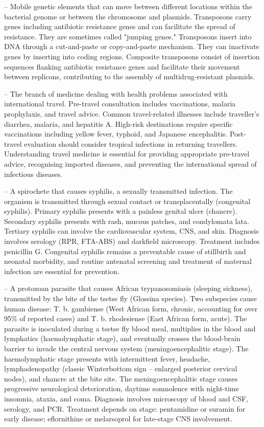 -- Mobile genetic elements that can move between different locations within the bacterial genome or between the chromosome and plasmids. Transposons carry genes including antibiotic resistance genes and can facilitate the spread of resistance. They are sometimes called "jumping genes." Transposons insert into DNA through a cut-and-paste or copy-and-paste mechanism. They can inactivate genes by inserting into coding regions. Composite transposons consist of insertion sequences flanking antibiotic resistance genes and facilitate their movement between replicons, contributing to the assembly of multidrug-resistant plasmids.

-- The branch of medicine dealing with health problems associated with international travel. Pre-travel consultation includes vaccinations, malaria prophylaxis, and travel advice. Common travel-related illnesses include traveller's diarrhea, malaria, and hepatitis A. High-risk destinations require specific vaccinations including yellow fever, typhoid, and Japanese encephalitis. Post-travel evaluation should consider tropical infections in returning travellers. Understanding travel medicine is essential for providing appropriate pre-travel advice, recognising imported diseases, and preventing the international spread of infectious diseases.

-- A spirochete that causes syphilis, a sexually transmitted infection. The organism is transmitted through sexual contact or transplacentally (congenital syphilis). Primary syphilis presents with a painless genital ulcer (chancre). Secondary syphilis presents with rash, mucous patches, and condylomata lata. Tertiary syphilis can involve the cardiovascular system, CNS, and skin. Diagnosis involves serology (RPR, FTA-ABS) and darkfield microscopy. Treatment includes penicillin G. Congenital syphilis remains a preventable cause of stillbirth and neonatal morbidity, and routine antenatal screening and treatment of maternal infection are essential for prevention.

-- A protozoan parasite that causes African trypanosomiasis (sleeping sickness), transmitted by the bite of the tsetse fly (Glossina species). Two subspecies cause human disease: T. b. gambiense (West African form, chronic, accounting for over 95\% of reported cases) and T. b. rhodesiense (East African form, acute). The parasite is inoculated during a tsetse fly blood meal, multiplies in the blood and lymphatics (haemolymphatic stage), and eventually crosses the blood-brain barrier to invade the central nervous system (meningoencephalitic stage). The haemolymphatic stage presents with intermittent fever, headache, lymphadenopathy (classic Winterbottom sign -- enlarged posterior cervical nodes), and chancre at the bite site. The meningoencephalitic stage causes progressive neurological deterioration, daytime somnolence with night-time insomnia, ataxia, and coma. Diagnosis involves microscopy of blood and CSF, serology, and PCR. Treatment depends on stage: pentamidine or suramin for early disease; eflornithine or melarsoprol for late-stage CNS involvement.

